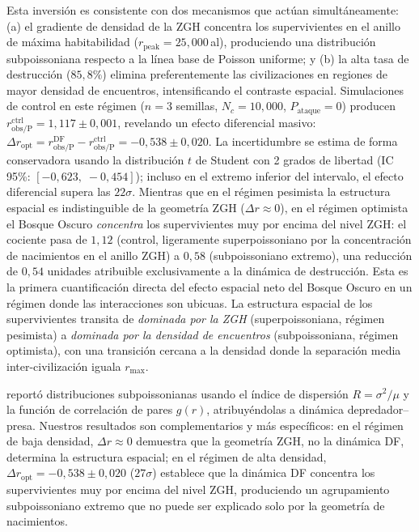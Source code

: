 \documentclass[11pt,a4paper,onecolumn]{article}
\begin{document}
Esta inversión es consistente con dos mecanismos que actúan
simultáneamente: (a) el gradiente de densidad de la ZGH concentra
los supervivientes en el anillo de máxima habitabilidad
($r_\text{peak} = 25{,}000$\,al), produciendo una distribución
subpoissoniana respecto a la línea base de Poisson uniforme; y
(b) la alta tasa de destrucción ($85{,}8\%$) elimina preferentemente
las civilizaciones en regiones de mayor densidad de encuentros,
intensificando el contraste espacial.
Simulaciones de control en este régimen ($n = 3$ semillas, $N_c =
10{,}000$, $P_\text{ataque} = 0$) producen
$r_\text{obs/P}^\text{ctrl} = 1{,}117 \pm 0{,}001$, revelando un efecto
diferencial masivo:
$\Delta r_\text{opt} = r_\text{obs/P}^\text{DF} -
r_\text{obs/P}^\text{ctrl} = -0{,}538 \pm 0{,}020$.
La incertidumbre se estima de forma conservadora usando la distribución
$t$ de Student con 2 grados de libertad (IC 95\%:
$[-0{,}623,\; -0{,}454]$); incluso en el extremo inferior del intervalo,
el efecto diferencial supera las $22\sigma$.
Mientras que en el régimen pesimista la estructura espacial es
indistinguible de la geometría ZGH ($\Delta r \approx 0$), en el
régimen optimista el Bosque Oscuro \emph{concentra} los supervivientes
muy por encima del nivel ZGH: el cociente pasa de $1{,}12$ (control,
ligeramente superpoissoniano por la concentración de nacimientos en el
anillo ZGH) a $0{,}58$ (subpoissoniano extremo), una reducción de
$0{,}54$ unidades atribuible exclusivamente a la dinámica de
destrucción.
Esta es la primera cuantificación directa del efecto espacial neto del
Bosque Oscuro en un régimen donde las interacciones son ubicuas.
La estructura espacial de los supervivientes transita de
\emph{dominada por la ZGH} (superpoissoniana, régimen pesimista) a
\emph{dominada por la densidad de encuentros} (subpoissoniana, régimen
optimista), con una transición cercana a la densidad donde la
separación media inter-civilización iguala $r_\text{max}$.

\citet{foucher2023} reportó distribuciones subpoissonianas usando el
índice de dispersión $R = \sigma^2/\mu$ y la función de correlación de
pares $g(r)$, atribuyéndolas a dinámica depredador--presa.
Nuestros resultados son complementarios y más específicos: en el régimen
de baja densidad, $\Delta r \approx 0$ demuestra que la geometría ZGH,
no la dinámica DF, determina la estructura espacial; en el régimen de
alta densidad, $\Delta r_\text{opt} = -0{,}538 \pm 0{,}020$ ($27\sigma$)
establece que la dinámica DF concentra los supervivientes muy por encima
del nivel ZGH, produciendo un agrupamiento subpoissoniano extremo que
no puede ser explicado solo por la geometría de nacimientos.
\end{document}
